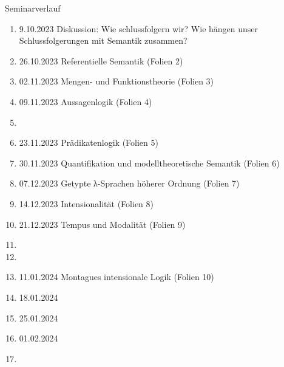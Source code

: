 \begin{frame}
  {Seminarverlauf}
  \onslide<+->
  \begin{enumerate}[<+->]\Lf\scriptsize
    \item \alert{9.10.2023} Diskussion: Wie schlussfolgern wir? Wie hängen unser Schlussfolgerungen mit Semantik zusammen?
    \item \alert{26.10.2023} Referentielle Semantik (Folien 2)
    \item \alert{02.11.2023} Mengen- und Funktionstheorie (Folien 3)
    \item \alert{09.11.2023} Aussagenlogik (Folien 4)
    \item[\rule{1.2em}{1.2em}] 
    \item \alert{23.11.2023} Prädikatenlogik (Folien 5)
    \item \alert{30.11.2023} Quantifikation und modelltheoretische Semantik (Folien 6)
    \item \alert{07.12.2023} Getypte λ-Sprachen höherer Ordnung (Folien 7)
    \item \alert{14.12.2023} Intensionalität (Folien 8)
    \item \alert{21.12.2023} Tempus und Modalität (Folien 9)
    \item[\rule{1.2em}{1.2em}] 
    \item[\rule{1.2em}{1.2em}] 
    \item \alert{11.01.2024} Montagues intensionale Logik (Folien 10)
    \item \alert{18.01.2024} 
    \item \alert{25.01.2024} 
    \item \alert{01.02.2024} 
    \item[\rule{1.2em}{1.2em}] 
  \end{enumerate}
\end{frame}

